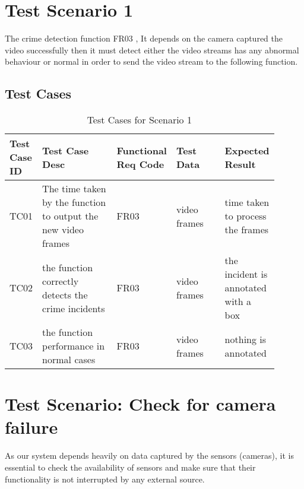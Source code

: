 \documentclass[12pt]{article}
\begin{document}
\section{Test Scenario 1}\label{sec:TSx}

The crime detection function FR03 , It depends on the camera captured the video successfully then it must detect either the video streams has any abnormal behaviour or normal in order to send the video stream to the following function.  
\subsection{Test Cases}
\begin{table}[h]
\caption{Test Cases for Scenario 1}
\label{tab:TC1}
\begin{tabular}{|p{0.1\linewidth}|p{0.3\linewidth}|p{0.1\linewidth}|p{0.2\linewidth}|p{0.2\linewidth}|}
\hline
Test Case ID & Test Case Desc & Functional Req Code & Test Data & Expected Result \\ \hline
TC01  & The time taken by the function to output the new video frames & FR03 &  video frames  &   time taken to process the frames               \\ \hline
TC02 & the function correctly detects the crime incidents   & FR03    &  video frames     &  the incident is annotated with a box          \\ \hline
TC03 & the function performance in normal cases  & FR03    &  video frames     &  nothing is annotated          \\ \hline

\end{tabular}
\end{table}
\newpage
\section{Test Scenario: Check for camera failure}\label{sec:TSy}
As our system depends heavily on data captured by the sensors (cameras), it is essential to check the availability of sensors and make sure that their functionality is not interrupted by any external source.
\end{document}
